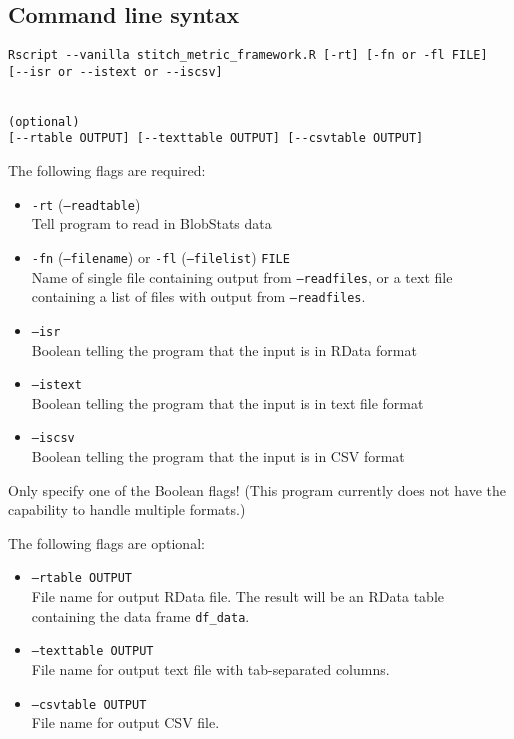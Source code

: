\documentclass{article}
\begin{document}
\subsection{Command line syntax}
\begin{verbatim}
Rscript --vanilla stitch_metric_framework.R [-rt] [-fn or -fl FILE] 
[--isr or --istext or --iscsv]


(optional)
[--rtable OUTPUT] [--texttable OUTPUT] [--csvtable OUTPUT]
\end{verbatim}

The following flags are required:
\begin{itemize}
\item[] \texttt{-rt} (\texttt{--readtable}) \\ Tell program to read in BlobStats data
\item[]\texttt{-fn} (\texttt{--filename}) or \texttt{-fl} (\texttt{--filelist}) \texttt{FILE}\\ Name of single file containing output from \texttt{--readfiles}, or a text file containing a list of files with output from \texttt{--readfiles}.
\item[]\texttt{--isr}\\Boolean telling the program that the input is in RData format
\item[]\texttt{--istext}\\Boolean telling the program that the input is in text file format
\item[] \texttt{--iscsv}\\Boolean telling the program that the input is in CSV format
\end{itemize}

Only specify one of the Boolean flags! (This program currently does not have the capability to handle multiple formats.)

The following flags are optional:
\begin{itemize}
\item[] \texttt{--rtable OUTPUT}\\ File name for output RData file. The result will be an RData table containing the data frame \texttt{df\_data}.
\item[] \texttt{--texttable OUTPUT}\\ File name for output text file with tab-separated columns.
\item[] \texttt{--csvtable OUTPUT}\\File name for output CSV file. 
\end{itemize}
\end{document}
